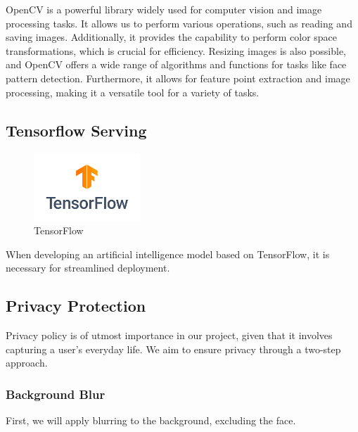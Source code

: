 OpenCV is a powerful library widely used for computer vision and image processing tasks. It allows us to perform various operations, such as reading and saving images. Additionally, it provides the capability to perform color space transformations, which is crucial for efficiency. Resizing images is also possible, and OpenCV offers a wide range of algorithms and functions for tasks like face pattern detection. Furthermore, it allows for feature point extraction and image processing, making it a versatile tool for a variety of tasks.\\



\subsection{\textbf{Tensorflow Serving}}

\begin{figure}[htp]
\centering
\includegraphics[width=4cm]{images/tensorflow.png}
\caption{TensorFlow}
\label{fig:tensorflow}
\end{figure}

When developing an artificial intelligence model based on TensorFlow, it is necessary for streamlined deployment.\\

\subsection{\textbf{Privacy Protection}}
Privacy policy is of utmost importance in our project, given that it involves capturing a user's everyday life. We aim to ensure privacy through a two-step approach. \\
\subsubsection{\textbf{Background Blur}}
First, we will apply blurring to the background, excluding the face. \\
